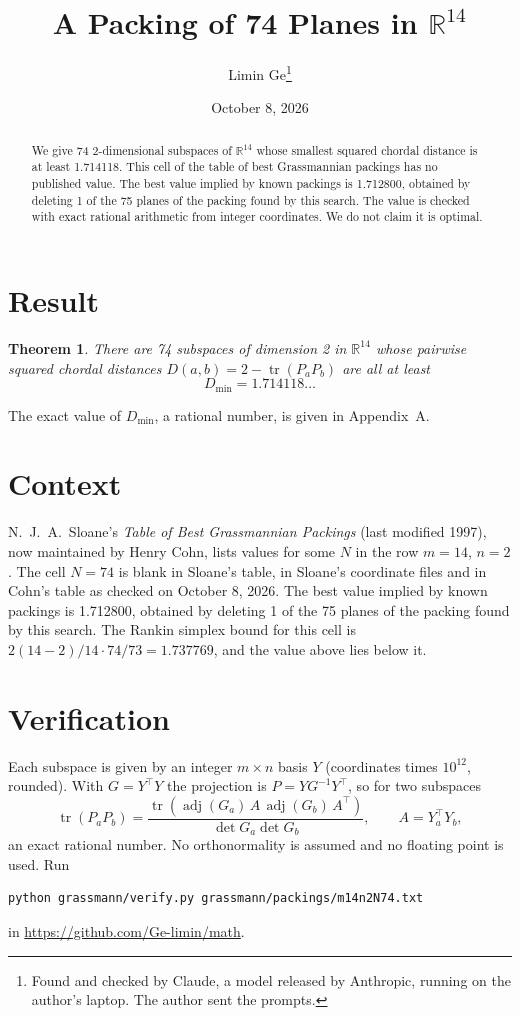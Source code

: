 \documentclass[11pt,a4paper]{article}
\title{A Packing of 74 Planes in $\mathbb{R}^{14}$}
\author{Limin Ge\thanks{Found and checked by Claude, a model released by Anthropic, running on the author's laptop. The author sent the prompts.}}
\date{October 8, 2026}
\newtheorem*{theorem}{Theorem}
\begin{document}
\maketitle
\begin{abstract}
We give 74 2-dimensional subspaces of $\mathbb{R}^{14}$ whose smallest squared chordal distance is at least 1.714118. This cell of the table of best Grassmannian packings has no published value. The best value implied by known packings is 1.712800, obtained by deleting 1 of the 75 planes of the packing found by this search. The value is checked with exact rational arithmetic from integer coordinates. We do not claim it is optimal.
\end{abstract}

\section{Result}
\begin{theorem}
There are 74 subspaces of dimension 2 in $\mathbb{R}^{14}$ whose pairwise squared chordal distances $D(a,b) = 2 - \operatorname{tr}(P_aP_b)$ are all at least
\[ D_{\min} = 1.714118\ldots \]
\end{theorem}
The exact value of $D_{\min}$, a rational number, is given in Appendix~A.


\section{Context}
N.~J.~A.~Sloane's \emph{Table of Best Grassmannian Packings} (last modified 1997), now maintained by Henry Cohn, lists values for some $N$ in the row $m=14$, $n=2$. The cell $N=74$ is blank in Sloane's table, in Sloane's coordinate files and in Cohn's table as checked on October 8, 2026. The best value implied by known packings is 1.712800, obtained by deleting 1 of the 75 planes of the packing found by this search. The Rankin simplex bound for this cell is $2(14-2)/14\cdot 74/73 = 1.737769$, and the value above lies below it.


\section{Verification}
Each subspace is given by an integer $m\times n$ basis $Y$ (coordinates times $10^{12}$, rounded). With $G=Y^\top Y$ the projection is $P=YG^{-1}Y^\top$, so for two subspaces
\[ \operatorname{tr}(P_aP_b)=\frac{\operatorname{tr}(\operatorname{adj}(G_a)\,A\,\operatorname{adj}(G_b)\,A^\top)}{\det G_a\det G_b},\qquad A=Y_a^\top Y_b, \]
an exact rational number. No orthonormality is assumed and no floating point is used. Run
\begin{verbatim}
python grassmann/verify.py grassmann/packings/m14n2N74.txt
\end{verbatim}
in \url{https://github.com/Ge-limin/math}.
\end{document}
